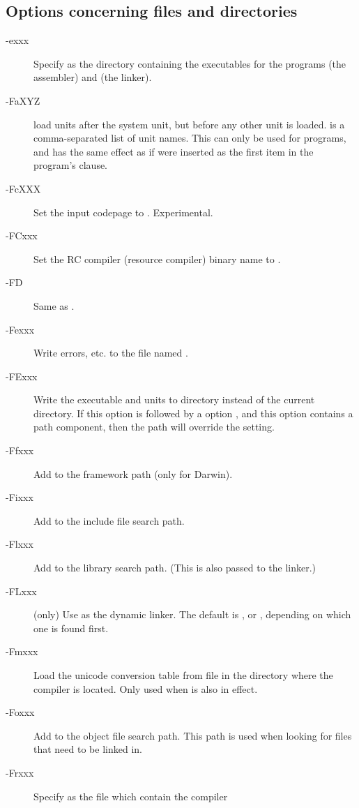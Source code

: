 \subsection{Options concerning files and directories}
\begin{description}
\item [-exxx] Specify  as the directory containing the
executables for the programs  (the assembler) and  (the linker).
\item[-FaXYZ] load units  after the system unit, but before any other 
unit is loaded.  is a comma-separated list of unit names. This can only be used
for programs, and has the same effect as if  were inserted as the
first item in the program's  clause.
\item[-FcXXX] Set the input codepage to . Experimental.
\item[-FCxxx] Set the RC compiler (resource compiler) binary name to .
\item [-FD] Same as .
\item [-Fexxx] Write errors, etc. to the file named .
\item [-FExxx] Write the executable and units to directory  
instead of the current directory. If this option
is followed by a   option , and this option contains a path 
component, then the  path will override the  setting.
\item [-Ffxxx] Add  to the framework path (only for Darwin).
\item [-Fixxx] Add  to the include file search path.
\item [-Flxxx] Add  to the library search path. (This is also 
passed to the linker.)
\item[-FLxxx] (\linux only) Use  as the dynamic linker. The default is , or
, depending on which one is found first.
\item[-Fmxxx] Load the unicode conversion table from file  in
the directory where the compiler is located. Only used when  is
also in effect.
\item[-Foxxx] Add  to the object file search path.
This path is used when looking for files that need to be linked in.
\item [-Frxxx] Specify  as the file which contain the compiler

\end{description}
